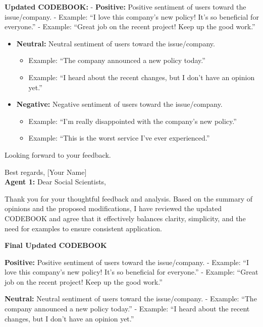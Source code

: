 \textbf{Updated CODEBOOK:} - \textbf{Positive:} Positive sentiment of
users toward the issue/company. - Example: ``I love this company's new
policy! It's so beneficial for everyone.'' - Example: ``Great job on the
recent project! Keep up the good work.''

\begin{itemize}
\tightlist
\item
  \textbf{Neutral:} Neutral sentiment of users toward the issue/company.

  \begin{itemize}
  \tightlist
  \item
    Example: ``The company announced a new policy today.''
  \item
    Example: ``I heard about the recent changes, but I don't have an
    opinion yet.''
  \end{itemize}
\item
  \textbf{Negative:} Negative sentiment of users toward the
  issue/company.

  \begin{itemize}
  \tightlist
  \item
    Example: ``I'm really disappointed with the company's new policy.''
  \item
    Example: ``This is the worst service I've ever experienced.''
  \end{itemize}
\end{itemize}

Looking forward to your feedback.

Best regards, {[}Your Name{]}\\

\textbf{Agent 1:} Dear Social Scientists,

Thank you for your thoughtful feedback and analysis. Based on the
summary of opinions and the proposed modifications, I have reviewed the
updated CODEBOOK and agree that it effectively balances clarity,
simplicity, and the need for examples to ensure consistent application.

\textbf{Final Updated CODEBOOK}

\textbf{Positive:} Positive sentiment of users toward the issue/company.
- Example: ``I love this company's new policy! It's so beneficial for
everyone.'' - Example: ``Great job on the recent project! Keep up the
good work.''

\textbf{Neutral:} Neutral sentiment of users toward the issue/company. -
Example: ``The company announced a new policy today.'' - Example: ``I
heard about the recent changes, but I don't have an opinion yet.''

